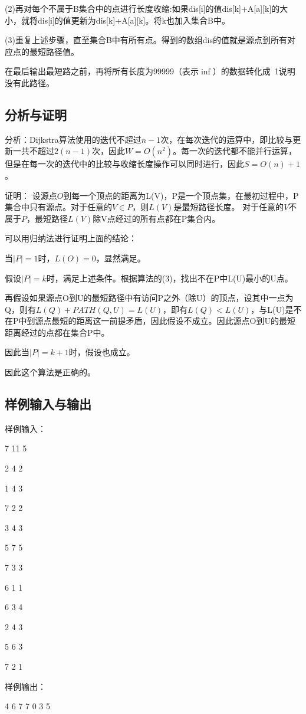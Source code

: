 \documentclass[UTF8,a4paperdui, %
]{ctexart}
\begin{document}
(2)再对每个不属于B集合中的点进行长度收缩:如果dis[i]的值dis[k]+A[a][k]的大小，就将dis[i]的值更新为dis[k]+A[a][k]。将k也加入集合B中。

(3)重复上述步骤，直至集合B中有所有点。得到的数组dis的值就是源点到所有对应点的最短路径值。

在最后输出最短路之前，再将所有长度为99999（表示$\inf$）的数据转化成~1说明没有此路径。
\subsection{分析与证明}
分析：Dijkstra算法使用的迭代不超过$n-1$次，在每次迭代的运算中，即比较与更新一共不超过$2(n-1)$次，因此$W=O(n^2)$。每一次的迭代都不能并行运算，但是在每一次的迭代中的比较与收缩长度操作可以同时进行，因此$S=O(n)+1$。

证明：
设源点$O$到每一个顶点的距离为L(V)，P是一个顶点集，在最初过程中，P集合中只有源点。对于任意的$V\in P$，则$L(V)$是最短路径长度。
对于任意的$V$不属于$P$，最短路径$L(V)$除V点经过的所有点都在P集合内。

可以用归纳法进行证明上面的结论：

当$|P|=1$时，$L(O)=0$，显然满足。

假设$|P|=k$时，满足上述条件。根据算法的(3)，找出不在P中L(U)最小的U点。

再假设如果源点O到U的最短路径中有访问P之外（除U）的顶点，设其中一点为Q，则有$L(Q)+PATH(Q, U)= L(U)$，即有$L(Q)<L(U)$，与L(U)是不在P中到源点最短的距离这一前提矛盾，因此假设不成立。因此源点O到U的最短距离经过的点都在集合P中。

因此当$|P|=k+1$时，假设也成立。

因此这个算法是正确的。

\subsection{样例输入与输出}
样例输入：

7 11 5

2 4 2

1 4 3


7 2 2

3 4 3

5 7 5

7 3 3

6 1 1

6 3 4

2 4 3

5 6 3

7 2 1

样例输出：

4 6 7 7 0 3 5 
\end{document}

